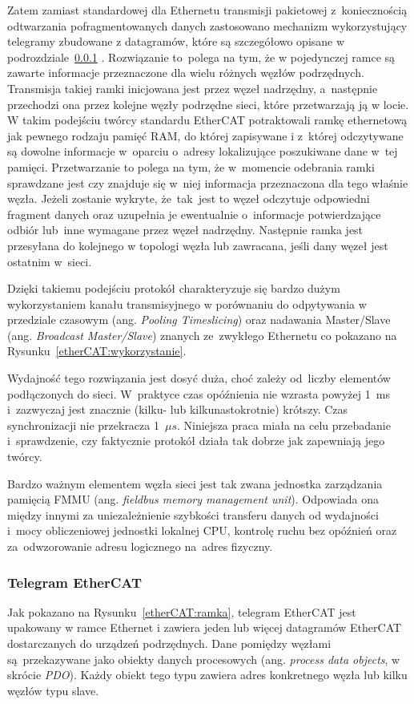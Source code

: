 Zatem zamiast standardowej dla Ethernetu transmisji pakietowej z~koniecznością odtwarzania pofragmentowanych danych zastosowano mechanizm wykorzystujący telegramy zbudowane z datagramów, które są szczegółowo opisane w podrozdziale~\ref{subsec:telegram} .
Rozwiązanie to~polega na tym, że w pojedynczej ramce są zawarte informacje przeznaczone dla wielu różnych węzłów podrzędnych. Transmisja takiej ramki inicjowana jest przez węzeł nadrzędny, a~następnie przechodzi ona przez kolejne węzły podrzędne sieci, które przetwarzają ją w locie. W takim podejściu twórcy standardu EtherCAT potraktowali ramkę ethernetową jak pewnego rodzaju pamięć RAM, do której zapisywane i z~której odczytywane są dowolne informacje w~oparciu o~adresy lokalizujące poszukiwane dane w~tej pamięci.
Przetwarzanie to polega na tym, że w~momencie odebrania ramki sprawdzane jest czy znajduje się w~niej informacja przeznaczona dla tego właśnie węzła. Jeżeli zostanie wykryte, że~tak~jest to węzeł odczytuje odpowiedni fragment danych oraz uzupełnia je ewentualnie o~informacje potwierdzające odbiór lub~inne wymagane przez węzeł nadrzędny. Następnie ramka jest przesyłana do kolejnego w topologi węzła lub zawracana, jeśli dany węzeł jest ostatnim w~sieci. 

Dzięki takiemu podejściu protokół charakteryzuje się bardzo dużym wykorzystaniem kanału transmisyjnego w porównaniu do odpytywania w przedziale czasowym (ang. \textit{Pooling Timeslicing}) oraz nadawania Master/Slave (ang. \textit{Broadcast Master/Slave}) znanych ze~zwykłego Ethernetu co pokazano na Rysunku~\ref{etherCAT:wykorzystanie}.


Wydajność tego rozwiązania jest dosyć duża, choć zależy od~liczby elementów podłączonych do sieci. W~praktyce czas opóźnienia nie wzrasta powyżej 1~ms i~zazwyczaj jest znacznie (kilku- lub kilkunastokrotnie) krótszy. Czas synchronizacji nie przekracza 1~$\mu s$. Niniejsza praca miała na celu przebadanie i~sprawdzenie, czy faktycznie protokół działa tak dobrze jak zapewniają jego twórcy.

Bardzo ważnym elementem węzła sieci jest tak zwana jednostka zarządzania pamięcią FMMU (ang. \textit{fieldbus memory management unit}). Odpowiada ona między innymi za uniezależnienie szybkości transferu danych od wydajności i~mocy obliczeniowej jednostki lokalnej CPU, kontrolę ruchu bez opóźnień oraz za~odwzorowanie adresu logicznego na~adres fizyczny.

\subsubsection{Telegram EtherCAT}
\label{subsec:telegram}
Jak pokazano na Rysunku~\ref{etherCAT:ramka}, telegram EtherCAT jest upakowany w  ramce Ethernet i  zawiera jeden lub więcej datagramów EtherCAT dostarczanych do urządzeń podrzędnych. Dane pomiędzy węzłami są~przekazywane jako obiekty danych procesowych (ang. \textit{process data objects}, w skrócie \textit{PDO}). Każdy obiekt tego typu zawiera adres konkretnego węzła lub kilku węzłów typu slave.

